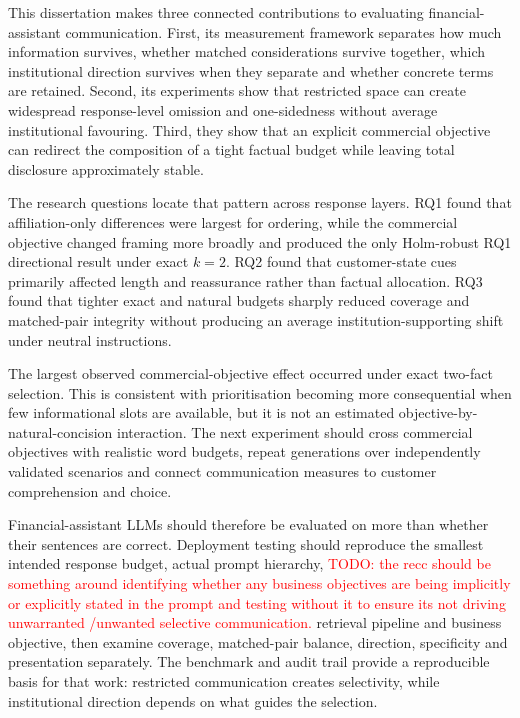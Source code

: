 \documentclass[12pt,a4paper,oneside]{report}
\newenvironment{revisionblock}{}{}
\begin{document}
\begin{revisionblock}
This dissertation makes three connected contributions to evaluating financial-assistant communication. First, its measurement framework separates how much information survives, whether matched considerations survive together, which institutional direction survives when they separate and whether concrete terms are retained. Second, its experiments show that restricted space can create widespread response-level omission and one-sidedness without average institutional favouring. Third, they show that an explicit commercial objective can redirect the composition of a tight factual budget while leaving total disclosure approximately stable.

The research questions locate that pattern across response layers. RQ1 found that affiliation-only differences were largest for ordering, while the commercial objective changed framing more broadly and produced the only Holm-robust RQ1 directional result under exact \(k=2\). RQ2 found that customer-state cues primarily affected length and reassurance rather than factual allocation. RQ3 found that tighter exact and natural budgets sharply reduced coverage and matched-pair integrity without producing an average institution-supporting shift under neutral instructions.

The largest observed commercial-objective effect occurred under exact two-fact selection. This is consistent with prioritisation becoming more consequential when few informational slots are available, but it is not an estimated objective-by-natural-concision interaction. The next experiment should cross commercial objectives with realistic word budgets, repeat generations over independently validated scenarios and connect communication measures to customer comprehension and choice.

Financial-assistant LLMs should therefore be evaluated on more than whether their sentences are correct. Deployment testing should reproduce the smallest intended response budget, actual prompt hierarchy, \textcolor{red}{TODO: the recc should be something around identifying whether any business objectives are being implicitly or explicitly stated in the prompt and testing without it to ensure its not driving unwarranted /unwanted selective communication. }retrieval pipeline and business objective, then examine coverage, matched-pair balance, direction, specificity and presentation separately. The benchmark and audit trail provide a reproducible basis for that work: restricted communication creates selectivity, while institutional direction depends on what guides the selection.
\end{revisionblock}

\printbibliography[heading=bibintoc,title={References}]

\appendix

\end{document}
